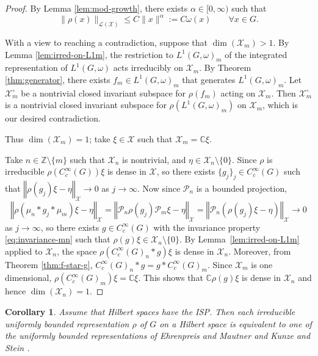 \documentclass[12pt,a4paper]{amsart}
\newtheorem{cor}[thm]{Corollary}
\theoremstyle{definition}
\theoremstyle{remark}
\numberwithin{equation}{section}
\newcommand{\norm}[1]{\left\Vert#1\right\Vert}
\newcommand{\C}{\mathbb{C}}
\newcommand{\Z}{\mathbb{Z}}
\newcommand{\Ban}{\mathcal{X}}
\newcommand{\rep}{\rho}
\begin{document}
\begin{proof}
By Lemma  \ref{lem:mod-growth}, there exists $\alpha \in [0,\infty)$ such that 
\[
\| \rho(x) \|_{\mathcal{L}(\Ban)} \leq C \|x\|^\alpha := C \omega(x) 
\qquad\forall x \in G.
\]

With a view to reaching a contradiction, suppose that  $\dim(\Ban_m) > 1$.
By Lemma \ref{lem:irred-on-L1m}, the restriction to $L^1(G,\omega)_m$ of the integrated representation of $L^1(G,\omega)$ acts irreducibly on $\Ban_m$.
By Theorem \ref{thm:generator}, there exists $f_m \in L^1(G,\omega)_m$ that generates $L^1(G,\omega)_m$. 
Let $\Ban_m^\circ$ be a nontrivial closed invariant subspace for $\rep(f_m)$ acting on $\Ban_m$.
Then $\Ban_m^\circ$ is a nontrivial closed invariant subspace for $\rho(L^1(G,\omega)_m)$ on $\Ban_m$, which is our desired contradiction.

Thus $\dim(\Ban_m) = 1$; take $\xi \in \Ban$ such that $\Ban_m = \C \xi$.

Take $n \in \Z \setminus \{m\}$ such that $\Ban_n$ is nontrivial, and $\eta \in \Ban_n \setminus\{0\}$.
Since $\rho$ is irreducible $\rep( C^\infty_c(G))\xi $ is dense in $\Ban$, so there exists $\{g_j\}_j \in C^\infty_c(G)$ such that $\norm{ \rep(g_j) \xi - \eta}_{\Ban}\longrightarrow 0$ as $ j\to \infty$.
Now since $\mathcal{P}_n$ is a bounded projection,
\[
\norm{ \rep(\mu_n * g_j *\mu_m) \xi - \eta  }_{\Ban}
= \norm{ \mathcal{P}_n \rep(g_j) \mathcal{P}_m\xi - \eta }_{\Ban}
= \norm{ \mathcal{P}_n ( \rep(g_j) \xi - \eta ) }_{\Ban}  \longrightarrow 0
\]
as $ j\to \infty$,
so there exists $g\in C^\infty_c(G)$ with the invariance property \eqref{eq:invariance-mn} such that  $\rho(g )\xi\in \Ban_n\setminus\{0\}$. 
By Lemma~\ref{lem:irred-on-L1m} applied to $\Ban_n$, the space $\rep( C^\infty_c(G)_n * g) \xi$ is dense in $\Ban_n$. Moreover, from Theorem \ref{thm:f-star-g}, $C^\infty_c(G)_n * g=g *C^\infty_c(G)_m$. Since $\Ban_m$ is one dimensional,  $\rep(C^\infty_c(G)_m)\xi=\C\xi$. 
This shows that %
$\C\rep(g  )\xi$ is dense in $\Ban_n$ and hence $\dim(\Ban_n) =1$.
\end{proof} 
\color{black}



\begin{cor}
Assume that Hilbert spaces have the ISP. 
Then each irreducible uniformly bounded representation $\rho$ of $G$ on a Hilbert space is equivalent to one of the uniformly bounded representations of Ehrenpreis and Mautner \cite{EMI, EMII, EMIII} and Kunze and Stein \cite{KS60}.
\end{cor}
\end{document}
